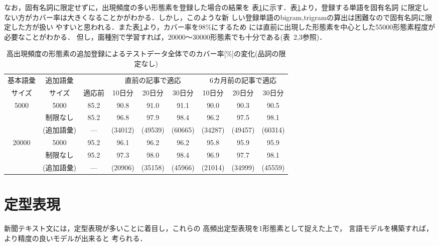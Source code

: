 なお，固有名詞に限定せずに，出現頻度の多い形態素を登録した場合の結果を
表\ref{tbl:Cover3}に示す．\mbox{表\ref{tbl:Cover3}より}，登録する単語を固有名詞
\mbox{に限定しない方がカバー率は大きくなることかがわかる．し}かし，このような新
しい登録単語のbigram,trigramの算出は困難なので固有名詞に限定した方が扱い
やすいと思われる．また表\ref{tbl:Cover3}より，カバー率を98\%にするため
には直前に出現した形態素を中心とした55000形態素程度が必要なことがわかる．
但し，面種別で学習すれば，20000〜30000形態素でも十分である(表~2,3参照)．

\vspace*{-1mm}
\begin{table}[htbp]
 \caption{高出現頻度の形態素の追加登録によるテストデータ全体でのカバー率[\%]の変化(品詞の限定なし)}\label{tbl:Cover3}
\begin{center}
\vspace*{-3mm}
\begin{tabular}{|c|c|c|c|c|c|c|c|c|}
\hline
基本語彙 & 追加語彙 & &
 \multicolumn{3}{c|}{直前の記事で適応} &
 \multicolumn{3}{c|}{6カ月前の記事で適応} \\
\cline{4-9}
サイズ & サイズ &
 適応前 & 10日分 & 20日分 & 30日分 & 10日分 & 20日分 & 30日分 \\
\hline
 5000 & 5000     & 85.2 & 90.8 & 91.0 & 91.1 & 90.0 & 90.3 & 90.5 \\
\cline{2-9}
      & 制限なし & 85.2 & 96.8 & 97.9& 98.4 & 96.2& 97.5& 98.1 \\
      &(追加語彙)&  ---  & (34012)&(49539)&(60665)&(34287)&(49457)&(60314)\\
\hline
 20000& 5000     & 95.2 & 96.1 & 96.2& 96.2 & 95.8 & 95.9 & 95.9 \\
\cline{2-9}
      & 制限なし & 95.2 & 97.3 & 98.0 & 98.4 & 96.9 & 97.7 & 98.1 \\
      &(追加語彙)&  ---  &(20906)&(35158)&(45966)&(21014)&(34999)&(45559)\\
\hline
\end{tabular}
\end{center}
\end{table}


\vspace*{-13mm}

\section{定型表現}

新聞テキスト文には，定型表現が多いことに着目し，これらの
高頻出定型表現を1形態素として捉えた上で，
言語モデルを構築すれば，より精度の良いモデルが出来ると
考られる．

